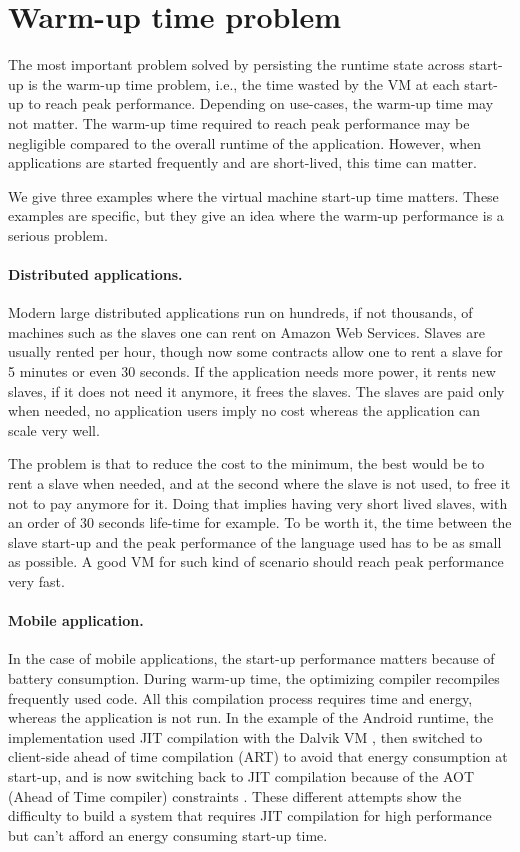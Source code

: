 \documentclass[a4paper,12pt,twoside]{../includes/ThesisStyle}
\begin{document}
\section{Warm-up time problem}
\label{sec:warmup}

The most important problem solved by persisting the runtime state across start-up is the warm-up time problem, i.e., the time wasted by the VM at each start-up to reach peak performance. Depending on use-cases, the warm-up time may not matter. The warm-up time required to reach peak performance may be negligible compared to the overall runtime of the application. However, when applications are started frequently and are short-lived, this time can matter.

We give three examples where the virtual machine start-up time matters. These examples are specific, but they give an idea where the warm-up performance is a serious problem.

\paragraph{Distributed applications.}
Modern large distributed applications run on hundreds, if not thousands, of machines such as the slaves one can rent on Amazon Web Services. Slaves are usually rented per hour, though now some contracts allow one to rent a slave for 5 minutes or even 30 seconds. If the application needs more power, it rents new slaves, if it does not need it anymore, it frees the slaves. The slaves are paid only when needed, no application users imply no cost whereas the application can scale very well.

The problem is that to reduce the cost to the minimum, the best would be to rent a slave when needed, and at the second where the slave is not used, to free it not to pay anymore for it. Doing that implies having very short lived slaves, with an order of 30 seconds life-time for example. To be worth it, the time between the slave start-up and the peak performance of the language used has to be as small as possible. A good VM for such kind of scenario should reach peak performance very fast.

\paragraph{Mobile application.}
In the case of mobile applications, the start-up performance matters because of  battery consumption. During warm-up time, the optimizing compiler recompiles frequently used code. All this compilation process requires time and energy, whereas the application is not run. In the example of the Android runtime, the implementation used JIT compilation with the Dalvik VM \cite{Born08a}, then switched to client-side ahead of time compilation (ART) to avoid that energy consumption at start-up, and is now switching back to JIT compilation because of the AOT (Ahead of Time compiler) constraints \cite{Geof15a}. These different attempts show the difficulty to build a system that requires JIT compilation for high performance but can't afford an energy consuming start-up time.
\end{document}

